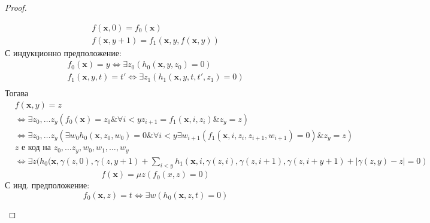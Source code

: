 \begin{proof}
\begin{itemize}
\begin{equation*}
                \begin{split}
                    f(\textbf{x}, 0) = f_0(\textbf{x}) \\
                    f(\textbf{x}, y+1) = f_1(\textbf{x}, y, f(\textbf{x}, y))
                \end{split}
            \end{equation*}
            С индукционно предположение:
            \begin{equation*}
                \begin{split}
                    f_0(\textbf{x}) = y \iff \exists z_0 (h_0(\textbf{x}, y, z_0) = 0) \\
                    f_1(\textbf{x}, y, t) = t' \iff \exists z_1 (h_1(\textbf{x}, y, t, t', z_1) = 0) \\
                \end{split}
            \end{equation*}
            Тогава
            \begin{equation*}
                \begin{split}
                    & f(\textbf{x}, y) = z \\ 
                    & \iff \exists z_0, \dots z_y (f_0(\textbf{x}) = z_0 \& \forall i < y z_{i+1} = f_1(\textbf{x}, i, z_i) \& z_y = z) \\
                    & \iff \exists z_0, \dots z_y (\exists w_0 h_0(\textbf{x}, z_0, w_0) = 0 \& \forall i < y \exists w_{i+1} (f_1(\textbf{x}, i, z_i, z_{i+1}, w_{i+1}) = 0) \& z_y = z) \\
                    & z \text{ е код на } z_0, \dots z_y, w_0, w_1, \dots, w_y \\
                    & \iff \exists z ( h_0(\textbf{x}, \gamma(z, 0), \gamma(z, y+1) + \sum\limits_{i<y} h_1(\textbf{x}, i, \gamma(z, i), \gamma(z, i+1), \gamma(z, i+y+1) + |\gamma(z, y) - z| = 0 )
                \end{split}
            \end{equation*}
            \subitem[минимизация]
            \begin{equation*}
                f(\textbf{x}) = \mu z (f_0(x, z) = 0)
            \end{equation*}
            С инд. предположение:
            \begin{equation*}
                f_0(\textbf{x}, z) = t \iff \exists w (h_0(\textbf{x}, z, t) = 0)
            \end{equation*}
            \begin{equation*}

\end{equation*}
\end{itemize}
\end{proof}
